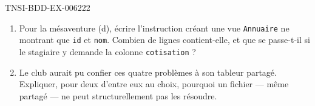 \begin{exercice}{TNSI-BDD-EX-006}{2}{22}
\begin{enumerate}
    requête \lstinline{SELECT nom FROM Adherent WHERE cotisation = 120} ? Que
    change-t-il alors ?
  \item Pour la mésaventure (d), écrire l'instruction créant une vue
    \lstinline{Annuaire} ne montrant que \lstinline{id} et \lstinline{nom}.
    Combien de lignes contient-elle, et que se passe-t-il si le stagiaire y
    demande la colonne \lstinline{cotisation} ?
  \item Le club aurait pu confier ces quatre problèmes à son tableur partagé.
    Expliquer, pour deux d'entre eux au choix, pourquoi un fichier — même
    partagé — ne peut structurellement pas les résoudre.
\end{enumerate}
\end{exercice}
